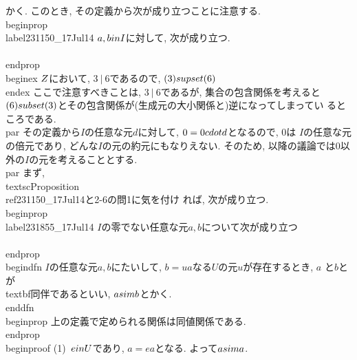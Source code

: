 かく. このとき, その定義から次が成り立つことに注意する.
\\begin{prop}
 \\label{231150_17Jul14}
 $a, b\\in I$に対して, 次が成り立つ.
 \\[
 a~|~b\\Longleftrightarrow (a)\\supset (b)
 \\]
\\end{prop}
\\begin{ex}
 $\\Z$において, $3~|~6$であるので, $(3)\\supset (6)$
\\end{ex}
ここで注意すべきことは, $3~|~6$であるが, 集合の包含関係を考えると
$(6)\\subset(3)$とその包含関係が(生成元の大小関係と)逆になってしまってい
るところである.
\\par その定義から$I$の任意な元$d$に対して, $0=0\\cdot d$となるので, $0$は
$I$の任意な元の倍元であり, どんな$I$の元の約元にもなりえない. そのため,
以降の議論では$0$以外の$I$の元を考えることとする.
\\par まず, \\textsc{Proposition}~\\ref{231150_17Jul14}と2-6の問1に気を付け
れば, 次が成り立つ.
\\begin{prop}
 \\label{231855_17Jul14}
 $I$の零でない任意な元$a, b$について次が成り立つ
 \\[
 a~|~b\\land b~|~a\\Leftrightarrow b=ua \\qquad (\\exe u\\in U).
 \\]
\\end{prop}
\\begin{dfn}
 $I$の任意な元$a, b$にたいして, $b=ua$なる$U$の元$u$が存在するとき, $a$
 と$b$とが\\textbf{同伴}であるといい, $a\\sim b$とかく.
\\end{dfn}
\\begin{prop}
 上の定義で定められる関係は同値関係である.
\\end{prop}
\\begin{proof}
 (1)~$e\\in U$であり, $a=ea$となる. よって$a\\sim a$.
